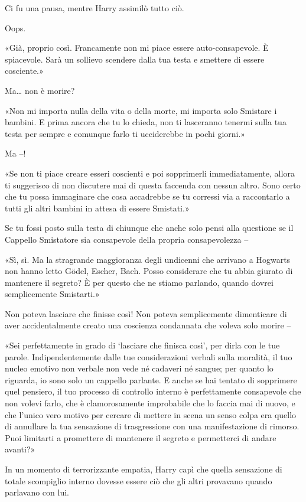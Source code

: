 Ci fu una pausa, mentre Harry assimilò tutto ciò.

Oops.

«Già, proprio così. Francamente non mi piace essere auto-consapevole. È spiacevole. Sarà un sollievo scendere dalla tua testa e smettere di essere cosciente.»

Ma… non è morire?

«Non mi importa nulla della vita o della morte, mi importa solo Smistare i bambini. E prima ancora che tu lo chieda, non ti lasceranno tenermi sulla tua testa per sempre e comunque farlo ti ucciderebbe in pochi giorni.»

Ma –!

«Se non ti piace creare esseri coscienti e poi sopprimerli immediatamente, allora ti suggerisco di non discutere mai di questa faccenda con nessun altro. Sono certo che tu possa immaginare che cosa accadrebbe se tu corressi via a raccontarlo a tutti gli altri bambini in attesa di essere Smistati.»

Se tu fossi posto sulla testa di chiunque che anche solo pensi alla questione se il Cappello Smistatore sia consapevole della propria consapevolezza –

«Sì, sì. Ma la stragrande maggioranza degli undicenni che arrivano a Hogwarts non hanno letto Gödel, Escher, Bach. Posso considerare che tu abbia giurato di mantenere il segreto? È per questo che ne stiamo parlando, quando dovrei semplicemente Smistarti.»

Non poteva lasciare che finisse così! Non poteva semplicemente dimenticare di aver accidentalmente creato una coscienza condannata che voleva solo morire –

«Sei perfettamente in grado di ‘lasciare che finisca così’, per dirla con le tue parole. Indipendentemente dalle tue considerazioni verbali sulla moralità, il tuo nucleo emotivo non verbale non vede né cadaveri né sangue; per quanto lo riguarda, io sono solo un cappello parlante. E anche se hai tentato di sopprimere quel pensiero, il tuo processo di controllo interno è perfettamente consapevole che non volevi farlo, che è clamorosamente improbabile che lo faccia mai di nuovo, e che l’unico vero motivo per cercare di mettere in scena un senso colpa era quello di annullare la tua sensazione di trasgressione con una manifestazione di rimorso. Puoi limitarti a promettere di mantenere il segreto e permetterci di andare avanti?»

In un momento di terrorizzante empatia, Harry capì che quella sensazione di totale scompiglio interno dovesse essere ciò che gli altri provavano quando parlavano con lui.

